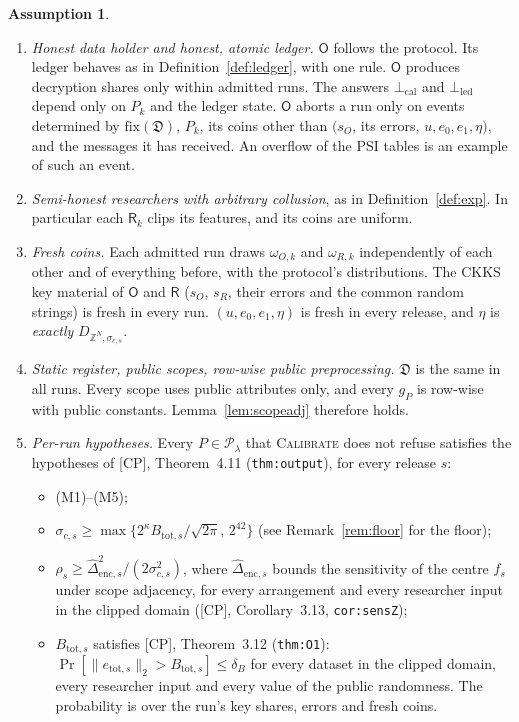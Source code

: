 \documentclass[11pt]{article}
\theoremstyle{definition}
\newtheorem{assumption}[definition]{Assumption}
\theoremstyle{plain}
\newcommand{\Rp}{\mathsf{R}}
\newcommand{\Op}{\mathsf{O}}
\newcommand{\Z}{\mathbb{Z}}
\newcommand{\nrm}[1]{\lVert #1\rVert}
\newcommand{\fs}{f}
\newcommand{\bD}{\mathfrak D}
\newcommand{\fix}{\mathrm{fix}}
\newcommand{\Cal}{\textsc{Calibrate}}
\newcommand{\CP}{\textup{[CP]}}
\begin{document}
\begin{assumption}\label{as:all}
\begin{enumerate}[nosep,label=(A\arabic*)]
  \item \emph{Honest data holder and honest, atomic ledger.} $\Op$ follows the protocol. Its ledger behaves as in Definition~\ref{def:ledger}, with one rule. $\Op$ produces decryption shares only within admitted runs. The answers $\bot_{\mathrm{cal}}$ and $\bot_{\mathrm{led}}$ depend only on $P_k$ and the ledger state. $\Op$ aborts a run only on events determined by $\fix(\bD)$, $P_k$, its coins other than $(s_O$, its errors, $u,e_0,e_1,\eta)$, and the messages it has received. An overflow of the PSI tables is an example of such an event.
  \item \emph{Semi-honest researchers with arbitrary collusion}, as in Definition~\ref{def:exp}. In particular each $\Rp_k$ clips its features, and its coins are uniform.
  \item \emph{Fresh coins.} Each admitted run draws $\omega_{O,k}$ and $\omega_{R,k}$ independently of each other and of everything before, with the protocol's distributions. The CKKS key material of $\Op$ and $\Rp$ ($s_O$, $s_R$, their errors and the common random strings) is fresh in every run. $(u,e_0,e_1,\eta)$ is fresh in every release, and $\eta$ is \emph{exactly} $D_{\Z^N,\sigma_{c,s}}$.
  \item \emph{Static register, public scopes, row-wise public preprocessing.} $\bD$ is the same in all runs. Every scope uses public attributes only, and every $g_P$ is row-wise with public constants. Lemma~\ref{lem:scopeadj} therefore holds.
  \item \emph{Per-run hypotheses.} Every $P\in\mathcal P_\lambda$ that \Cal{} does not refuse satisfies the hypotheses of \CP, Theorem~4.11 (\texttt{thm:output}), for every release $s$:
  \begin{itemize}[nosep]
    \item (M1)--(M5);
    \item $\sigma_{c,s}\ge\max\{2^{\kappa}B_{\mathrm{tot},s}/\sqrt{2\pi},\,2^{42}\}$ (see Remark~\ref{rem:floor} for the floor);
    \item $\rho_s\ge\widehat\Delta_{\mathrm{enc},s}^2/(2\sigma_{c,s}^2)$, where $\widehat\Delta_{\mathrm{enc},s}$ bounds the sensitivity of the centre $\fs_s$ under scope adjacency, for every arrangement and every researcher input in the clipped domain (\CP, Corollary~3.13, \texttt{cor:sensZ});
    \item $B_{\mathrm{tot},s}$ satisfies \CP, Theorem~3.12 (\texttt{thm:O1}): $\Pr[\nrm{e_{\mathrm{tot},s}}_2>B_{\mathrm{tot},s}]\le\delta_B$ for every dataset in the clipped domain, every researcher input and every value of the public randomness. The probability is over the run's key shares, errors and fresh coins.

\end{itemize}
\end{enumerate}
\end{assumption}
\end{document}
